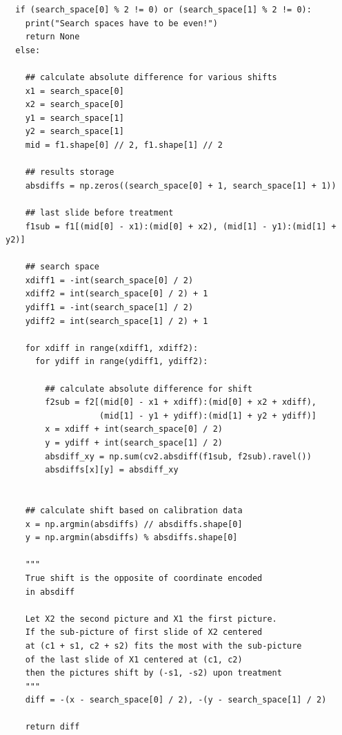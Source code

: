 \documentclass[pdftex,12pt,a4paper]{report}
\begin{document}
\begin{appendices}
\begin{verbatim}
  if (search_space[0] % 2 != 0) or (search_space[1] % 2 != 0):
    print("Search spaces have to be even!")
    return None
  else:
    
    ## calculate absolute difference for various shifts
    x1 = search_space[0]
    x2 = search_space[0]
    y1 = search_space[1]
    y2 = search_space[1]
    mid = f1.shape[0] // 2, f1.shape[1] // 2
        
    ## results storage        
    absdiffs = np.zeros((search_space[0] + 1, search_space[1] + 1))

    ## last slide before treatment
    f1sub = f1[(mid[0] - x1):(mid[0] + x2), (mid[1] - y1):(mid[1] + y2)]
    
    ## search space 
    xdiff1 = -int(search_space[0] / 2)
    xdiff2 = int(search_space[0] / 2) + 1
    ydiff1 = -int(search_space[1] / 2)
    ydiff2 = int(search_space[1] / 2) + 1
    
    for xdiff in range(xdiff1, xdiff2):
      for ydiff in range(ydiff1, ydiff2):
      
        ## calculate absolute difference for shift
        f2sub = f2[(mid[0] - x1 + xdiff):(mid[0] + x2 + xdiff), 
                   (mid[1] - y1 + ydiff):(mid[1] + y2 + ydiff)]
        x = xdiff + int(search_space[0] / 2)
        y = ydiff + int(search_space[1] / 2)
        absdiff_xy = np.sum(cv2.absdiff(f1sub, f2sub).ravel())
        absdiffs[x][y] = absdiff_xy
        
        
    ## calculate shift based on calibration data
    x = np.argmin(absdiffs) // absdiffs.shape[0]
    y = np.argmin(absdiffs) % absdiffs.shape[0]
    
    """
    True shift is the opposite of coordinate encoded
    in absdiff
    
    Let X2 the second picture and X1 the first picture.
    If the sub-picture of first slide of X2 centered
    at (c1 + s1, c2 + s2) fits the most with the sub-picture
    of the last slide of X1 centered at (c1, c2)
    then the pictures shift by (-s1, -s2) upon treatment
    """
    diff = -(x - search_space[0] / 2), -(y - search_space[1] / 2)

    return diff
\end{verbatim}

\end{appendices}
\end{document}
